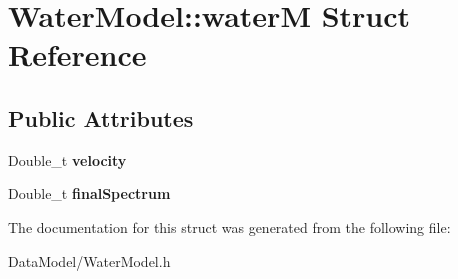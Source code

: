 \hypertarget{structWaterModel_1_1waterM}{
\section{WaterModel::waterM Struct Reference}
\label{structWaterModel_1_1waterM}
}
\subsection*{Public Attributes}
\begin{DoxyCompactItemize}
\item 
\hypertarget{structWaterModel_1_1waterM_a25888dbf4985077f63b1219f5b0b5037}{
Double\_\-t {\bfseries velocity}}
\label{structWaterModel_1_1waterM_a25888dbf4985077f63b1219f5b0b5037}

\item 
\hypertarget{structWaterModel_1_1waterM_a3983d2bfa5887f8abbedc7e6be12be57}{
Double\_\-t {\bfseries finalSpectrum}}
\label{structWaterModel_1_1waterM_a3983d2bfa5887f8abbedc7e6be12be57}

\end{DoxyCompactItemize}


The documentation for this struct was generated from the following file:\begin{DoxyCompactItemize}
\item 
DataModel/WaterModel.h\end{DoxyCompactItemize}
